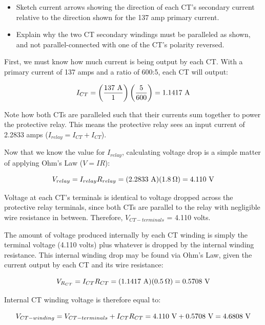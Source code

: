 \begin{itemize}
\item{} Sketch current arrows showing the direction of each CT's secondary current relative to the direction shown for the 137 amp primary current.
\item{} Explain why the two CT secondary windings must be paralleled as shown, and not parallel-connected with one of the CT's polarity reversed.
\end{itemize}







 






First, we must know how much current is being output by each CT.  With a primary current of 137 amps and a ratio of 600:5, each CT will output:

$$I_{CT} = \left({137 \hbox{ A} \over 1} \right) \left({5 \over 600} \right) = 1.1417 \hbox{ A}$$

Note how both CTs are paralleled such that their currents sum together to power the protective relay.  This means the protective relay sees an input current of 2.2833 amps ($I_{relay} = I_{CT} + I_{CT}$).

Now that we know the value for $I_{relay}$, calculating voltage drop is a simple matter of applying Ohm's Law ($V = IR$):

$$V_{relay} = I_{relay} R_{relay} = (2.2833 \hbox{ A})(1.8 \> \Omega) = 4.110 \hbox{ V}$$

Voltage at each CT's terminals is identical to voltage dropped across the protective relay terminals, since both CTs are parallel to the relay with negligible wire resistance in between.  Therefore, $V_{CT-terminals}$ = 4.110 volts.

\vskip 10pt

The amount of voltage produced internally by each CT winding is simply the terminal voltage (4.110 volts) plus whatever is dropped by the internal winding resistance.  This internal winding drop may be found via Ohm's Law, given the current output by each CT and its wire resistance:

$$V_{R_{CT}} = I_{CT} R_{CT} = (1.1417 \hbox{ A})(0.5 \> \Omega) = 0.5708 \hbox{ V}$$

Internal CT winding voltage is therefore equal to:

$$V_{CT-winding} = V_{CT-terminals} + I_{CT} R_{CT} = 4.110 \hbox{ V} + 0.5708 \hbox{ V} = 4.6808 \hbox{ V}$$





